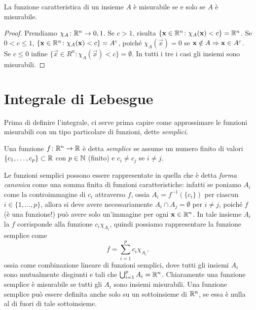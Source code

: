 \begin{osservazione} \label{o:funzione-caratteristica-misurabile}
	La funzione caratteristica di un insieme $A$ è misurabile se e solo se $A$ è misurabile.
\end{osservazione}
\begin{proof}
	Prendiamo $\chi_A\colon\mathbb{R}^n\to{0,1}$.
	Se $c>1$, risulta $\{\mathbf{x}\in \mathbb{R}^n\colon\chi_A(\mathbf{x})<c\}=\mathbb{R}^n$.
	Se $0<c\leq1$, $\{\mathbf{x}\in \mathbb{R}^n\colon \chi_A(\mathbf{x})<c\}={A}^c$, poich\'e $\chi_A(\vec x)=0$ se $\mathbf{x}\notin A\Rightarrow\mathbf{x}\in{A}^c$.
	Se $c\leq 0$ infine $\{\vec x\in R^n\colon \chi_A(\vec x)<c\}=\emptyset$.
	In tutti i tre i casi gli insiemi sono misurabili.
\end{proof}

\section{Integrale di Lebesgue}
Prima di definire l'integrale, ci serve prima capire come approssimare le funzioni misurabili con un tipo particolare di funzioni, dette \emph{semplici}.
\begin{definizione} \label{d:funzione-semplice}
	Una funzione $f\colon\mathbb{R}^n\to\mathbb{R}$ è detta \emph{semplice} se assume un numero finito di valori $\{c_1,\dots,c_p\}\subset\mathbb{R}$ con $p\in\mathbb{N}$ (finito) e $c_i\neq c_j$ se $i\neq j$.
\end{definizione}
Le funzioni semplici possono essere rappresentate in quella che è detta \emph{forma canonica} come una somma finita di funzioni caratteristiche: infatti se poniamo $A_i$ come la controimmagine di $c_i$ attraverso $f$, ossia $A_i=f^{-1}(\{c_i\})$ per ciascun $i\in\{1,\dots,p\}$, allora si deve avere necessariamente $A_i\cap A_j=\emptyset$ per $i\neq j$, poich\'e $f$ (è una funzione!) può avere solo un'immagine per ogni $\mathbf{x}\in\mathbb{R}^n$.
In tale insieme $A_i$ la $f$ corrisponde alla funzione $c_i\chi_{A_i}$, quindi possiamo rappresentare la funzione semplice come
\begin{equation}
	f=\sum_{i=1}^pc_i\chi_{A_i},
	\label{eq:rappresentazione-canonica-funzione-semplice}
\end{equation}
ossia come combinazione lineare di funzioni semplici, dove tutti gli insiemi $A_i$ sono mutualmente disgiunti e tali che $\bigcup_{i=1}^pA_i=\mathbb{R}^n$.
Chiaramente una funzione semplice è misurabile se tutti gli $A_i$ sono insiemi misurabili.
Una funzione semplice può essere definita anche solo su un sottoinsieme di $\mathbb{R}^n$, se essa è nulla al di fuori di tale sottoinsieme.


